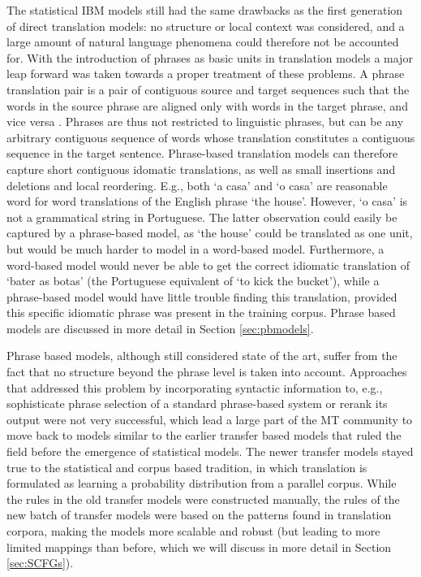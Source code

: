 The statistical IBM models still had the same drawbacks as the first generation of direct translation models: no structure or local context was considered, and a large amount of natural language phenomena could therefore not be accounted for. With the introduction of phrases as basic units in translation models \citep{wang1998grammar,och1999improved} a major leap forward was taken towards a proper treatment of these problems. A phrase translation pair is a pair of contiguous source and target sequences such that the words in the source phrase are aligned only with words in the target phrase, and vice versa \citep{och2000improved}. Phrases are thus not restricted to linguistic phrases, but can be any arbitrary contiguous sequence of words whose translation constitutes a contiguous sequence in the target sentence. Phrase-based translation models can therefore capture short contiguous idomatic translations, as well as small insertions and deletions and local reordering. E.g., both `a casa' and `o casa' are reasonable word for word translations of the English phrase `the house'. However, `o casa' is not a grammatical string in Portuguese. The latter observation could easily be captured by a phrase-based model, as `the house' could be translated as one unit, but would be much harder to model in a word-based model. Furthermore, a word-based model would never be able to get the correct idiomatic translation of `bater as botas' (the Portuguese equivalent of `to kick the bucket'), while a phrase-based model would have little trouble finding this translation, provided this specific idiomatic phrase was present in the training corpus. Phrase based models are discussed in more detail in Section \ref{sec:pbmodels}.

Phrase based models, although still considered state of the art, suffer from the fact that no structure beyond the phrase level is taken into account. Approaches that addressed this problem by incorporating syntactic information to, e.g., sophisticate phrase selection of a standard phrase-based system \citep{koehn2003statistical} or rerank its output \citep{och2004alignment} were not very successful, which lead a large part of the MT community to move back to models similar to the earlier transfer based models that ruled the field before the emergence of statistical models. The newer transfer models stayed true to the statistical and corpus based tradition, in which translation is formulated as learning a probability distribution from a parallel corpus. While the rules in the old transfer models were constructed manually, the rules of the new batch of transfer models were based on the patterns found in translation corpora, making the models more scalable and robust (but leading to more limited mappings than before, which we will discuss in more detail in Section \ref{sec:SCFGs}).

